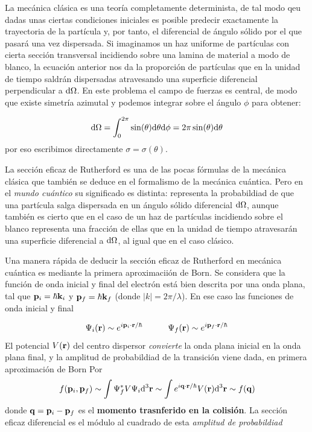 La mecánica clásica es una teoría completamente determinista, de tal modo qeu dadas unas ciertas condiciones iniciales es posible predecir exactamente la trayectoria de la partícula y, por tanto, el diferencial de ángulo sólido por el que pasará una vez dispersada. Si imaginamos un haz uniforme de partículas con cierta sección transversal incidiendo sobre una lamina de material a modo de blanco, la ecuación anterior nos da la proporción de partículas que en la unidad de tiempo saldrán dispersadas atravesando una superficie diferencial perpendicular a $\mathrm{d} \Omega$. En este problema el campo de fuerzas es central, de modo que existe simetría azimutal y podemos integrar sobre el ángulo $\phi$ para obtener:

\begin{equation}
	\mathrm{d} \Omega = \int_0^{2\pi} \sin (\theta) \mathrm{d} \theta \mathrm{d} \phi = 2 \pi \sin (\theta) \mathrm{d} \theta
\end{equation}
por eso escribimos directamente $\sigma = \sigma (\theta)$.

La sección eficaz de Rutherford es una de las pocas fórmulas de la mecánica clásica que también se deduce en el formalismo de la mecánica cuántica. Pero en el \textit{mundo cuántico} su significado es distinta: representa la probabildiad de que una partícula salga dispersada en un ángulo sólido diferencial $\mathrm{d} \Omega$, aunque también es cierto que en el caso de un haz de partículas incidiendo sobre el blanco representa una fracción de ellas que en la unidad de tiempo atravesarán una superficie diferencial a $\mathrm{d} \Omega$, al igual que en el caso clásico.

Una manera rápida de deducir la sección eficaz de Rutherford en mecánica cuántica es mediante la primera aproximaciión de Born. Se considera que la función de onda inicial y final del electrón está bien descrita por una onda plana, tal que $\mathbf{p}_i=\hbar \mathbf{k}_i$ y $\mathbf{p}_f = \hbar \mathbf{k}_f$ (donde $|k|=2\pi / \lambda$).  En ese caso las funciones de onda inicial y final

\begin{equation}
	\Psi_i (\mathbf{r}) \sim e^{i \mathbf{p}_i \cdot \mathbf{r} / \hbar} \quad \quad \quad \Psi_f (\mathbf{r}) \sim e^{i \mathbf{p}_f \cdot \mathbf{r} / \hbar}
\end{equation}
El potencial $V(\mathbf{r})$ del centro dispersor \textit{convierte} la onda plana inicial en la onda plana final, y la amplitud de probabildiad de la transición viene dada, en primera aproximación de Born Por
\begin{equation}
	f(\mathbf{p}_i,\mathbf{p}_f) \sim \int \Psi_f^* V \Psi_i \mathrm{d}^3 \mathbf{r} \sim \int e^{i \mathbf{q} \cdot \mathbf{r} / \hbar} V(\mathbf{r}) \mathrm{d}^3 \mathbf{r} \sim f(\mathbf{q})
\end{equation}
donde $\mathbf{q}=\mathbf{p}_i - \mathbf{p}_f$ es el \textbf{momento trasnferido en la colisión}. La sección eficaz diferencial es el módulo al cuadrado de esta \textit{amplitud de probabildiad}

